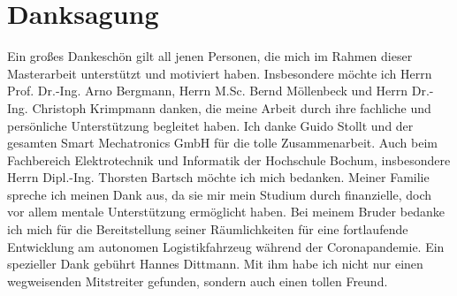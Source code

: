 \documentclass[12pt,a4paper,oneside,numbers=noenddot,headsepline,captions=tableheading,toc=bibliography,openany,tikz,margin=5mm]{scrbook}
\begin{document}
	
	\chapter*{\textbf{Danksagung}}
	
	
	
	Ein großes Dankeschön gilt all jenen Personen, die mich im Rahmen dieser Masterarbeit
	unterstützt und motiviert haben. Insbesondere möchte ich Herrn Prof. Dr.-Ing. Arno Bergmann, Herrn M.Sc. Bernd Möllenbeck und Herrn Dr.-Ing. Christoph Krimpmann danken, die meine Arbeit durch ihre fachliche und persönliche Unterstützung begleitet haben. Ich danke Guido Stollt und der gesamten Smart Mechatronics GmbH für die tolle Zusammenarbeit. Auch beim Fachbereich Elektrotechnik und Informatik der Hochschule Bochum, insbesondere Herrn Dipl.-Ing. Thorsten Bartsch möchte ich mich bedanken. Meiner Familie spreche ich meinen Dank aus, da sie mir mein Studium durch finanzielle, doch vor allem mentale Unterstützung ermöglicht haben. Bei meinem Bruder bedanke ich mich für die Bereitstellung seiner Räumlichkeiten für eine fortlaufende Entwicklung am autonomen Logistikfahrzeug während der Coronapandemie. Ein spezieller Dank gebührt Hannes Dittmann. Mit ihm habe ich nicht nur einen wegweisenden Mitstreiter gefunden, sondern auch einen tollen Freund.
	
	
	\tableofcontents
	\cleardoublepage
	
	
	
\end{document}
